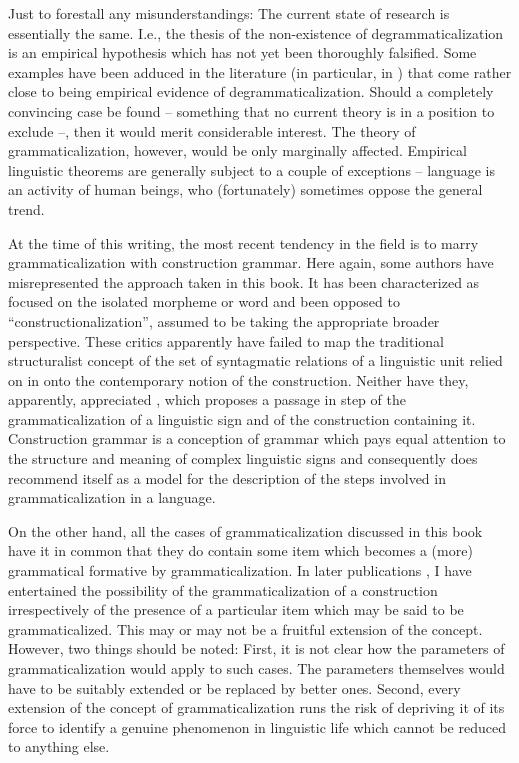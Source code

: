 Just to forestall any misunderstandings: The current state of research is essentially the same. I.e., the thesis of the non-existence of degrammaticalization is an empirical hypothesis which has not yet been thoroughly falsified. Some examples have been adduced in the literature (in particular, in \citealt{Norde2009}) that come rather close to being empirical evidence of degrammaticalization. Should a completely convincing case be found – something that no current theory is in a position to exclude –, then it would merit considerable interest. The theory of grammaticalization, however, would be only marginally affected. Empirical linguistic theorems are generally subject to a couple of exceptions – language is an activity of human beings, who (fortunately) sometimes oppose the general trend.

At the time of this writing, the most recent tendency in the field is to marry grammaticalization with construction grammar. Here again, some authors have misrepresented the approach taken in this book. It has been characterized as focused on the isolated morpheme or word and been opposed to “constructionalization”, assumed to be taking the appropriate broader perspective. These critics apparently have failed to map the traditional structuralist concept of the set of syntagmatic relations of a linguistic unit relied on in  onto the contemporary notion of the construction. Neither have they, apparently, appreciated , which proposes a passage in step of the grammaticalization of a linguistic sign and of the construction containing it. Construction grammar is a conception of grammar which pays equal attention to the structure and meaning of complex linguistic signs and consequently does recommend itself as a model for the description of the steps involved in grammaticalization in a language.

On the other hand, all the cases of grammaticalization discussed in this book have it in common that they do contain some item which becomes a (more) grammatical formative by grammaticalization. In later publications \citep[§2.3]{Lehmann2002b}, I have entertained the possibility of the grammaticalization of a construction irrespectively of the presence of a particular item which may be said to be grammaticalized. This may or may not be a fruitful extension of the concept. However, two things should be noted: First, it is not clear how the parameters of grammaticalization would apply to such cases. The parameters themselves would have to be suitably extended or be replaced by better ones. Second, every extension of the concept of grammaticalization runs the risk of depriving it of its force to identify a genuine phenomenon in linguistic life which cannot be reduced to anything else.

